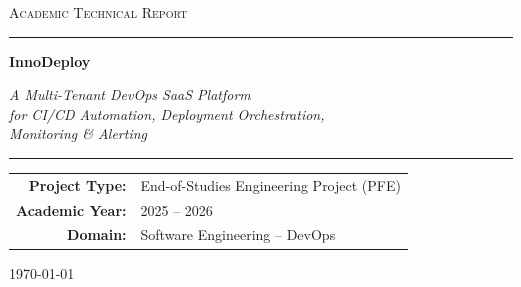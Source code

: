 \documentclass[12pt,a4paper,twoside]{report}
\begin{document}
\begin{titlepage}
\begin{center}

\vspace*{1cm}

{\Large\textsc{Academic Technical Report}}

\vspace{0.5cm}
\rule{\textwidth}{1.5pt}

\vspace{1cm}

{\fontsize{36}{42}\selectfont\bfseries\color{NavyBlue} InnoDeploy}

\vspace{0.5cm}

{\LARGE\textit{A Multi-Tenant DevOps SaaS Platform\\for CI/CD Automation, Deployment Orchestration,\\Monitoring \& Alerting}}

\vspace{0.5cm}
\rule{\textwidth}{1.5pt}

\vspace{2cm}

{\large
\begin{tabular}{rl}
\textbf{Project Type:} & End-of-Studies Engineering Project (PFE) \\
\textbf{Academic Year:} & 2025 -- 2026 \\
\textbf{Domain:} & Software Engineering -- DevOps \\
\end{tabular}
}

\vspace{2cm}


\vfill

{\large\today}

\end{center}
\end{titlepage}


\tableofcontents
\newpage
\listoffigures
\newpage
\listoftables
\newpage
\end{document}
